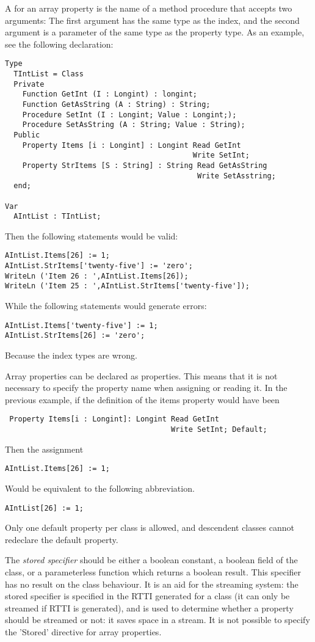 A  for an array property is the name of a method
procedure that accepts two arguments: The first argument has the same
type as the index, and the second argument is a parameter of the same
type as the property type.
As an example, see the following declaration:
\begin{verbatim}
Type 
  TIntList = Class
  Private
    Function GetInt (I : Longint) : longint;
    Function GetAsString (A : String) : String;
    Procedure SetInt (I : Longint; Value : Longint;);
    Procedure SetAsString (A : String; Value : String);
  Public
    Property Items [i : Longint] : Longint Read GetInt
                                           Write SetInt;
    Property StrItems [S : String] : String Read GetAsString
                                            Write SetAsstring;
  end;

Var 
  AIntList : TIntList;
\end{verbatim}
Then the following statements would be valid:
\begin{verbatim}
AIntList.Items[26] := 1;
AIntList.StrItems['twenty-five'] := 'zero';
WriteLn ('Item 26 : ',AIntList.Items[26]);
WriteLn ('Item 25 : ',AIntList.StrItems['twenty-five']);
\end{verbatim}
While the following statements would generate errors:
\begin{verbatim}
AIntList.Items['twenty-five'] := 1;
AIntList.StrItems[26] := 'zero';
\end{verbatim}
Because the index types are wrong.

Array properties can be declared as  properties. This means that
it is not necessary to specify the property name when assigning or reading
it. In the previous example, if the definition of the items property would
have been
\begin{verbatim}
 Property Items[i : Longint]: Longint Read GetInt
                                      Write SetInt; Default;
\end{verbatim}
Then the assignment
\begin{verbatim}
AIntList.Items[26] := 1;
\end{verbatim}
Would be equivalent to the following abbreviation.
\begin{verbatim}
AIntList[26] := 1;
\end{verbatim}
Only one default property per class is allowed, and descendent classes
cannot redeclare the default property.

The {\em stored specifier} should be either a boolean constant, a boolean
field of the class, or a parameterless function which returns a boolean
result. This specifier has no result on the class behaviour. It is an aid
for the streaming system: the stored specifier is specified in the RTTI
generated for a class (it can only be streamed if RTTI is generated), 
and is used to determine whether a property should be streamed or not: 
it saves space in a stream. It is not possible to specify the 'Stored'
directive for array properties.

